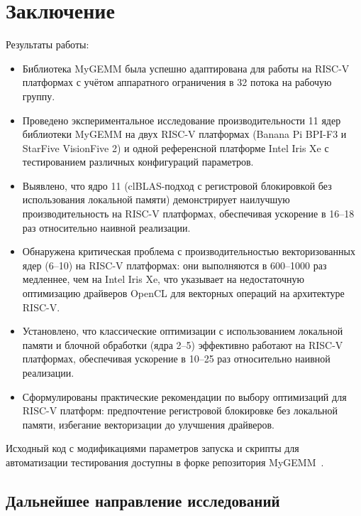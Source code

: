 
\section*{Заключение}

Результаты работы:

\begin{itemize}
    \item Библиотека MyGEMM была успешно адаптирована для работы на RISC-V платформах с учётом аппаратного ограничения в 32 потока на рабочую группу.
    
    \item Проведено экспериментальное исследование производительности 11 ядер библиотеки MyGEMM на двух RISC-V платформах (Banana Pi BPI-F3 и StarFive VisionFive 2) и одной референсной платформе Intel Iris Xe с тестированием различных конфигураций параметров.
    
    \item Выявлено, что ядро 11 (clBLAS-подход с регистровой блокировкой без использования локальной памяти) демонстрирует наилучшую производительность на RISC-V платформах, обеспечивая ускорение в 16--18 раз относительно наивной реализации.
    
    \item Обнаружена критическая проблема с производительностью векторизованных ядер (6--10) на RISC-V платформах: они выполняются в 600--1000 раз медленнее, чем на Intel Iris Xe, что указывает на недостаточную оптимизацию драйверов OpenCL для векторных операций на архитектуре RISC-V.
    
    \item Установлено, что классические оптимизации с использованием локальной памяти и блочной обработки (ядра 2--5) эффективно работают на RISC-V платформах, обеспечивая ускорение в 10--25 раз относительно наивной реализации.
    
    \item Сформулированы практические рекомендации по выбору оптимизаций для RISC-V платформ: предпочтение регистровой блокировке без локальной памяти, избегание векторизации до улучшения драйверов.
\end{itemize}

Исходный код с модификациями параметров запуска и скрипты для автоматизации тестирования доступны в форке репозитория MyGEMM~\cite{mygemm_repo_test}.

\subsection*{Дальнейшее направление исследований}

